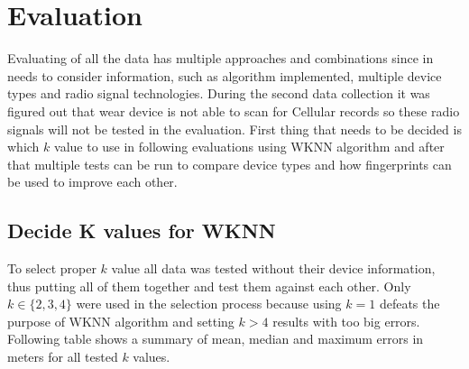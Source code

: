 \section{Evaluation}\label{sec:Evaluation}
Evaluating of all the data has multiple approaches and combinations since in needs to consider information, such as algorithm implemented, multiple device types and radio signal technologies. During the second data collection it was figured out that wear device is not able to scan for Cellular records so these radio signals will not be tested in the evaluation. First thing that needs to be decided is which $k$ value to use in following evaluations using WKNN algorithm and after that multiple tests can be run to compare device types and how fingerprints can be used to improve each other.

\subsection{Decide K values for WKNN}\label{sec:TestingKValuesForWKNN}
To select proper $k$ value all data was tested without their device information, thus putting all of them together and test them against each other. Only $k \in \{2, 3, 4\}$ were used in the selection process because using $k = 1$ defeats the purpose of WKNN algorithm and setting $k > 4$ results with too big errors. Following table shows a summary of mean, median and maximum errors in meters for all tested $k$ values.

\vspace*{6pt}
\begin{table}[h]
	\begin{center}
		\caption{List of errors for multiple K values}
		\label{tab04c06}
	\end{center}
\end{table}
\vspace*{-\baselineskip}
\vspace*{6pt}

